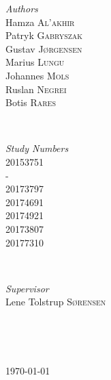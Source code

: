 \documentclass[12p]{article}
\begin{document}
\begin{titlepage}
	\begin{minipage}{0.4\textwidth}
    \begin{flushleft} \large
    \emph{Authors}\\
        Hamza \textsc{Al'akhir} \\
        Patryk \textsc{Gabryszak} \\
    	Gustav \textsc{Jørgensen} \\
    	Marius \textsc{Lungu} \\
    	Johannes \textsc{Mols} \\
    	Ruslan \textsc{Negrei} \\
    	Botis \textsc{Rares} \\
    \end{flushleft}
    \end{minipage}
    ~
    \begin{minipage}{0.4\textwidth}
    \begin{flushright} \large
    \emph{Study Numbers} \\
        20153751 \\
        - \\
        20173797 \\
        20174691 \\
        20174921 \\
        20173807\\
        20177310 \\
    \end{flushright}
    \end{minipage}\\[0.5cm]
    
    
    \begin{minipage}{0.4\textwidth}
    \begin{flushleft} \large
    \emph{Supervisor}\\
        Lene Tolstrup \textsc{Sørensen} \\
    \end{flushleft}
    \end{minipage}
    ~
    \begin{minipage}{0.4\textwidth}
    \begin{flushright} \large
    \end{flushright}
    \end{minipage}\\[0.5cm]

	
	\vfill\vfill\vfill %
	
	{\large\today} %
	
    
\end{titlepage}
\end{document}
